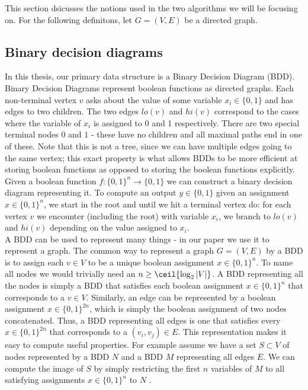 \documentclass[../master/master.tex]{subfiles}
\begin{document}
This section dsicusses the notions used in the two algorithms we will be focusing on. For the following definitons, let $G=(V,E)$ be a directed graph.

\subsection{Binary decision diagrams}
In this thesis, our primary data structure is a Binary Decision Diagram (BDD). Binary Decision Diagrams represent boolean functions as directed graphs. Each non-terminal vertex $v$ asks about the value of some variable $x_i\in \{0,1\}$ and has edges to two children. The two edges $lo(v)$ and $hi(v)$ correspond to the cases where the variable of $x_i$ is assigned to 0 and 1 respectively. There are two special terminal nodes $0$ and $1$ - these have no children and all maximal paths end in one of these. Note that this is not a tree, since we can have multiple edges going to the same vertex; this exact property is what allows BDDs to be more efficient at storing boolean functions as opposed to storing the boolean functions explicitly.
Given a boolean function $f: \{0,1\}^n \rightarrow \{0,1\}$ we can construct a binary decision diagram representing it. To compute an output $y\in \{0,1\}$ given an assignment  $x\in\{0,1\}^n$, we start in the root and until we hit a terminal vertex do: for each vertex $v$ we encounter (including the root) with variable $x_i$, we branch to $lo(v)$ and $hi(v)$ depending on the value assigned to $x_i$. \\

A BDD can be used to represent many things - in our paper we use it to represent a graph. The common way to represent a graph $G = (V, E)$ by a BDD is to assign each $v\in V$ to be a unique boolean assignment $x\in\{0,1\}^n$. To name all nodes we would trivially need an $n \geq \ceil{\log_2{|V|}}$. A BDD representing all the nodes is simply a BDD that satisfies each boolean assignment $x\in\{0,1\}^n$ that corresponds to a $v\in V$. Similarly, an edge can be represented by a boolean assignment $x\in\{0,1\}^{2n}$, which is simply the boolean assignment of two nodes concatenated. Thus, a BDD representing all edges is one that satisfies every $x\in\{0,1\}^{2n}$ that corresponds to a $(v_i, v_j)\in E$. This representation makes it easy to compute useful properties. For example assume we have a set $S\subset V$ of nodes represented by a BDD $N$ and a BDD $M$ representing all edges $E$. We can compute the image of $S$ by simply restricting the first $n$ variables of $M$ to all satisfying assignments $x\in\{0,1\}^{n}$ to $N$ \cite{lockstep}.
\end{document}

